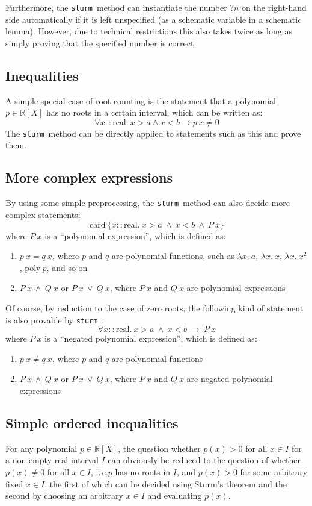 \documentclass[11pt,a4paper,oneside]{article}
\newcommand{\ie}{i.\,e.}
\newcommand{\RR}{\mathbb{R}}
\newcommand{\sturm}{\texttt{sturm}}
\newcommand{\card}{\textrm{card}}
\newcommand{\real}{\textrm{real}}
\begin{document}
Furthermore, the \sturm\ method can instantiate the number $?n$ on the right-hand side automatically if it is left unspecified (as a schematic variable in a schematic lemma). However, due to technical restrictions this also takes twice as long as simply proving that the specified number is correct.

\newpage
\subsection{Inequalities}

A simple special case of root counting is the statement that a polynomial $p\in\RR[X]$ has no roots in a certain interval, which can be written as:
$$\forall x::\real.\ x > a \wedge x < b \longrightarrow p\ x \neq 0$$
The \sturm\ method can be directly applied to statements such as this and prove them.

\subsection{More complex expressions}

By using some simple preprocessing, the \sturm\ method can also decide more complex statements:
$$\card\ \{x::\real.\ x > a\ \wedge\ x < b\ \wedge\ P\ x\}$$
where $P\ x$ is a \enquote{polynomial expression}, which is defined as:
\begin{enumerate}
\item $p\ x= q\ x$, where $p$ and $q$ are polynomial functions, such as $\lambda x.\ a$, $\lambda x.\ x$, $\lambda x.\ x^2$, $\mathrm{poly}\ p$, and so on
\item $P\ x\ \wedge\ Q\ x$ or $P\ x\ \vee\ Q\ x$, where $P\ x$ and $Q\ x$ are polynomial expressions
\end{enumerate}

Of course, by reduction to the case of zero roots, the following kind of statement is also provable by \sturm\ :
$$\forall x::\real.\ x > a\ \wedge\ x < b\ \longrightarrow\ P\ x$$
where $P\ x$ is a \enquote{negated polynomial expression}, which is defined as:
\begin{enumerate}
\item $p\ x\neq q\ x$, where $p$ and $q$ are polynomial functions
\item $P\ x\ \wedge\ Q\ x$ or $P\ x\ \vee\ Q\ x$, where $P\ x$ and $Q\ x$ are negated polynomial expressions
\end{enumerate}

\subsection{Simple ordered inequalities}
For any polynomial $p\in\RR[X]$, the question whether $p(x) > 0$ for all $x\in I$ for a non-empty real interval $I$ can obviously be reduced to the question of whether $p(x) \neq 0$ for all $x\in I$, \ie $p$ has no roots in $I$, and $p(x) > 0$ for some arbitrary fixed $x\in I$, the first of which can be decided using Sturm's theorem and the second by choosing an arbitrary $x\in I$ and evaluating $p(x)$.\\
\end{document}

